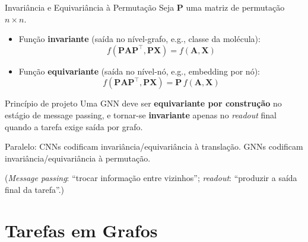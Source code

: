 \documentclass[aspectratio=169,xcolor=dvipsnames]{beamer}
\begin{document}
  \begin{frame}{Invariância e Equivariância à Permutação}
    Seja $\mathbf{P}$ uma matriz de permutação $n \times n$.
    \begin{itemize}
      \item Função \textbf{invariante} (saída no nível-grafo, e.g., classe da molécula):
        \[
          f(\mathbf{P} \mathbf{A} \mathbf{P}^\top, \mathbf{P} \mathbf{X}) = f(\mathbf{A}, \mathbf{X})
        \]
      \item Função \textbf{equivariante} (saída no nível-nó, e.g., embedding por nó):
        \[
          f(\mathbf{P} \mathbf{A} \mathbf{P}^\top, \mathbf{P} \mathbf{X}) = \mathbf{P}\, f(\mathbf{A}, \mathbf{X})
        \]
    \end{itemize}

    \vspace{0.5em}
    \begin{block}{Princípio de projeto}
      Uma GNN deve ser \textbf{equivariante por construção} no estágio de
      message passing, e tornar-se \textbf{invariante} apenas no \textit{readout}
      final quando a tarefa exige saída por grafo.
    \end{block}

    \vspace{0.3em}
    Paralelo: CNNs codificam invariância/equivariância à translação. GNNs codificam
    invariância/equivariância à permutação.

    \vspace{0.2em}
    {\footnotesize (\textit{Message passing}: ``trocar informação entre vizinhos''; \textit{readout}: ``produzir a saída final da tarefa''.)}
  \end{frame}

  \section{Tarefas em Grafos}
\end{document}
